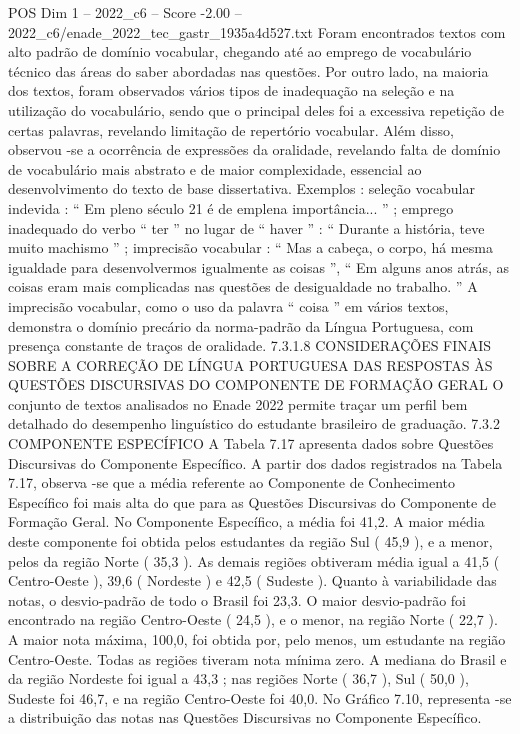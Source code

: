 \begin{textsample}{POS Dim 1 – 2022\_c6 – Score -2.00 – 2022\_c6/enade\_2022\_tec\_gastr\_1935a4d527.txt}
Foram encontrados textos com alto padrão de domínio vocabular, chegando até ao emprego de vocabulário técnico das áreas do saber abordadas nas questões.
Por outro lado, na maioria dos textos, foram observados vários tipos de inadequação na seleção e na utilização do vocabulário, sendo que o principal deles foi a excessiva repetição de certas palavras, revelando limitação de repertório vocabular.
Além disso, observou -se a ocorrência de expressões da oralidade, revelando falta de domínio de vocabulário mais abstrato e de maior complexidade, essencial ao desenvolvimento do texto de base dissertativa.
Exemplos : seleção vocabular indevida : “ Em pleno século 21 é de emplena importância... ” ; emprego inadequado do verbo “ ter ” no lugar de “ haver ” : “ Durante a história, teve muito machismo ” ; imprecisão vocabular : “ Mas a cabeça, o corpo, há mesma igualdade para desenvolvermos igualmente as coisas ”, “ Em alguns anos atrás, as coisas eram mais complicadas nas questões de desigualdade no trabalho. ” A imprecisão vocabular, como o uso da palavra “ coisa ” em vários textos, demonstra o domínio precário da norma-padrão da Língua Portuguesa, com presença constante de traços de oralidade. 7.3.1.8 CONSIDERAÇÕES FINAIS SOBRE A CORREÇÃO DE LÍNGUA PORTUGUESA DAS RESPOSTAS ÀS QUESTÕES DISCURSIVAS DO COMPONENTE DE FORMAÇÃO GERAL O conjunto de textos analisados no Enade 2022 permite traçar um perfil bem detalhado do desempenho linguístico do estudante brasileiro de graduação. 7.3.2 COMPONENTE ESPECÍFICO A Tabela 7.17 apresenta dados sobre Questões Discursivas do Componente Específico.
A partir dos dados registrados na Tabela 7.17, observa -se que a média referente ao Componente de Conhecimento Específico foi mais alta do que para as Questões Discursivas do Componente de Formação Geral.
No Componente Específico, a média foi 41,2.
A maior média deste componente foi obtida pelos estudantes da região Sul ( 45,9 ), e a menor, pelos da região Norte ( 35,3 ).
As demais regiões obtiveram média igual a 41,5 ( Centro-Oeste ), 39,6 ( Nordeste ) e 42,5 ( Sudeste ).
Quanto à variabilidade das notas, o desvio-padrão de todo o Brasil foi 23,3.
O maior desvio-padrão foi encontrado na região Centro-Oeste ( 24,5 ), e o menor, na região Norte ( 22,7 ).
A maior nota máxima, 100,0, foi obtida por, pelo menos, um estudante na região Centro-Oeste.
Todas as regiões tiveram nota mínima zero.
A mediana do Brasil e da região Nordeste foi igual a 43,3 ; nas regiões Norte ( 36,7 ), Sul ( 50,0 ), Sudeste foi 46,7, e na região Centro-Oeste foi 40,0.
No Gráfico 7.10, representa -se a distribuição das notas nas Questões Discursivas no Componente Específico.

\end{textsample}
